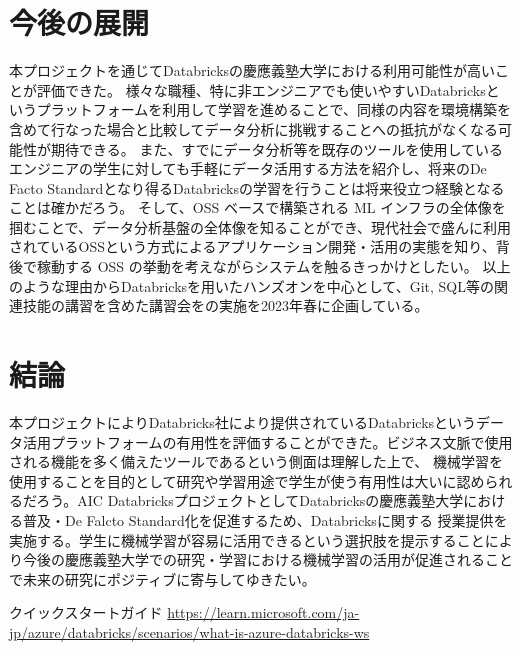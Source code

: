 \documentclass[twocolumn]{jsarticle}
\begin{document}
\section{今後の展開}
本プロジェクトを通じてDatabricksの慶應義塾大学における利用可能性が高いことが評価できた。
様々な職種、特に非エンジニアでも使いやすいDatabricksというプラットフォームを利用して学習を進めることで、同様の内容を環境構築を含めて行なった場合と比較してデータ分析に挑戦することへの抵抗がなくなる可能性が期待できる。
また、すでにデータ分析等を既存のツールを使用しているエンジニアの学生に対しても手軽にデータ活用する方法を紹介し、将来のDe Facto Standardとなり得るDatabricksの学習を行うことは将来役立つ経験となることは確かだろう。
そして、OSS ベースで構築される ML インフラの全体像を掴むことで、データ分析基盤の全体像を知ることができ、現代社会で盛んに利用されているOSSという方式によるアプリケーション開発・活用の実態を知り、背後で稼動する OSS の挙動を考えながらシステムを触るきっかけとしたい。
以上のような理由からDatabricksを用いたハンズオンを中心として、Git, SQL等の関連技能の講習を含めた講習会をの実施を2023年春に企画している。
\section{結論}
本プロジェクトによりDatabricks社により提供されているDatabricksというデータ活用プラットフォームの有用性を評価することができた。ビジネス文脈で使用される機能を多く備えたツールであるという側面は理解した上で、
機械学習を使用することを目的として研究や学習用途で学生が使う有用性は大いに認められるだろう。AIC DatabricksプロジェクトとしてDatabricksの慶應義塾大学における普及・De Falcto Standard化を促進するため、Databricksに関する
授業提供を実施する。学生に機械学習が容易に活用できるという選択肢を提示することにより今後の慶應義塾大学での研究・学習における機械学習の活用が促進されることで未来の研究にポジティブに寄与してゆきたい。

\begin{thebibliography}{9}
    クイックスタートガイド
   \url{https://learn.microsoft.com/ja-jp/azure/databricks/scenarios/what-is-azure-databricks-ws}
  \end{thebibliography}
\end{document}
